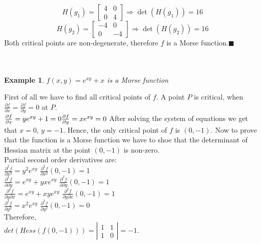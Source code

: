 \documentclass[]{article}
\newtheorem{example}{Example}
\newcommand{\imply}{\Rightarrow}
\begin{document}
\begin{equation}
	H(g_1) = \begin{bmatrix} 4 & 0 \\ 0 & 4 \end{bmatrix}
	\imply \det(H(g_1)) = 16
\end{equation}
\begin{equation}
	H(g_2) = \begin{bmatrix} -4 & 0 \\ 0 & -4 \end{bmatrix}
	\imply \det(H(g_2)) =  16
\end{equation}
Both critical points are non-degenerate, therefore $f$ is a Morse function.$\blacksquare$\\
\\
\\
\begin{example}
$f(x,y)=e^{xy}+x$ is a Morse function
\end{example}
First of all we have to find all critical points of $f$. A point $P$ is critical, when $\frac{\partial f}{\partial x}=\frac{\partial f}{\partial y}=0$ at $P$. \\
$\frac{\partial f}{\partial x}= ye^{xy}+1=0 \\
\frac{\partial f}{\partial y}=xe^{xy}=0$
After solving the system of equations we get that $x=0$, $y=-1$. Hence, the only critical point of $f$ is $(0,-1)$. Now to prove that the function is a Morse function we have to shoe that the determinant of Hessian matrix at the point $(0,-1)$ is non-zero. \\
Partial second order derivatives are: \\
$\frac{\partial^2 f}{\partial x^2}=y^2e^{xy}$
$\frac{\partial^2 f}{\partial x^2}(0,-1)=1$\\
$\frac{\partial^2 f}{\partial \partial y}=e^{xy}+yxe^{xy}$
$\frac{\partial^2 f}{\partial \partial y}(0,-1)=1$\\
$\frac{\partial^2 f}{\partial y \partial x}=e^{xy}+xye^{xy}$
$\frac{\partial^2 f}{\partial y \partial x}(0,-1)=1$\\
$\frac{\partial^2 f}{\partial y^2}=x^2e^{xy}$
$\frac{\partial^2 f}{\partial y^2}(0,-1)=0$\\
Therefore, \\
$det(Hess(f(0,-1)))=\left| \begin{array}{cc} 1 & 1 \\ 1 & 0 \end{array} \right|=-1$. \\
\end{document}
